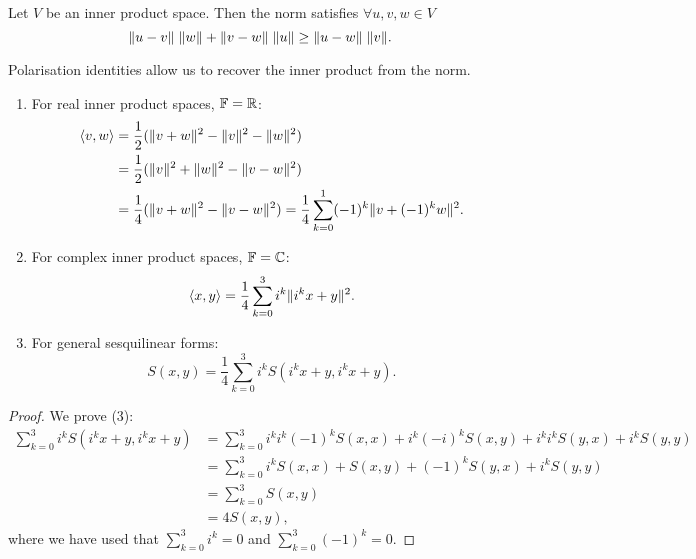 \begin{proposition} \label{PtolemyInequality}
Let $V$ be an inner product space. Then the norm satisfies $\forall u,v,w\in V$
\[ \lVert u-v\rVert\;\lVert w\rVert + \lVert v-w\rVert\;\lVert u\rVert \geq \lVert u-w\rVert\;\lVert v\rVert. \]
\end{proposition}

Polarisation identities allow us to recover the inner product from the norm.
\begin{theorem} \label{polarisationIdentities}
\mbox{}
\begin{enumerate}
\item For real inner product spaces, $\mathbb{F} = \mathbb{R}$:
\begin{align*}
\inner{v,w} &= \frac{1}{2}(\norm{v+w}^2 - \norm{v}^2-\norm{w}^2) \\
&= \frac{1}{2}(\norm{v}^2 + \norm{w}^2-\norm{v-w}^2) \\
&= \frac{1}{4}(\norm{v+w}^2 - \norm{v-w}^2) = \frac{1}{4}\sum_{k=0}^1 (-1)^k\norm{v+(-1)^k w}^2.
\end{align*}
\item For complex inner product spaces, $\mathbb{F} = \mathbb{C}$:
\[ \inner{x,y} = \frac{1}{4}\sum_{k=0}^3 i^k\norm{i^k x+y}^2. \]
\item For general sesquilinear forms:
\[ S(x,y) = \frac{1}{4}\sum_{k=0}^3 i^k S(i^k x+y, i^k x+y). \]
\end{enumerate}
\end{theorem}
\begin{proof}
We prove (3):
\begin{align*}
\sum_{k=0}^3 i^k S(i^k x+y, i^k x+y) &= \sum_{k=0}^3 i^ki^k(-1)^k S(x, x) + i^k(-i)^kS(x,y) + i^ki^kS(y,x) + i^kS(y,y) \\
&= \sum_{k=0}^3 i^k S(x, x) + S(x,y) + (-1)^kS(y,x) + i^kS(y,y) \\
&= \sum_{k=0}^3 S(x,y) \\
&= 4 S(x,y),
\end{align*}
where we have used that $\sum_{k=0}^3 i^k = 0$ and $\sum_{k=0}^3 (-1)^k = 0$.
\end{proof}

